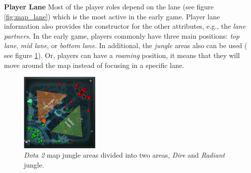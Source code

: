 \textbf{Player Lane} Most of the player roles depend on the lane (see figure \ref{fig:map_lane}) which is the most active in the early game. Player lane information also provides the constructor for the other attributes, e.g., the \textit{lane partners}. In the early game, players commonly have three main positions: \textit{top lane}, \textit{mid lane}, or \textit{bottom lane}. In additional, the \textit{jungle} areas also can be used ( see figure \ref{fig:map_jungle}). Or, players can have a \textit{roaming} position, it means that they will move around the map instead of focusing in a specific lane.

\begin{figure}
\centering
\includegraphics[width=1.5in]{./figures/map_jungle.png}
\caption{\textit{Dota 2} map jungle areas divided into two areas, \textit{Dire} and \textit{Radiant} jungle.}
\label{fig:map_jungle}
\end{figure}

